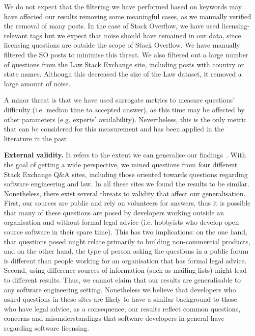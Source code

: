 \documentclass{elsarticle}
\begin{document}
We do not expect that the filtering we have performed based on keywords may have affected our results removing some meaningful cases, as we manually verified the removal of many posts. In the case of Stack Overflow, we have used licensing-relevant tags but we expect that noise should have remained in our data, since licensing questions are outside the scope of Stack Overflow. We have manually filtered the SO posts to minimise this threat. We also filtered out a large number of questions from the Law Stack Exchange site, including posts with country or state names. Although this decreased the size of the Law dataset, it removed a large amount of noise.

A minor threat is that we have used surrogate metrics to measure questions' difficulty (i.e. median time to accepted answer), as this time may be affected by other parameters (e.g. experts' availability). Nevertheless, this is the only metric that can be considered for this measurement and has been applied in the literature in the past~\cite{abdellatif2020challenges}.

\textbf{External validity.} It refers to the extent we can generalise our findings~\cite{yin2013case}. With the goal of getting a wide perspective, we mined questions from four different Stack Exchange Q\&A sites, including those oriented towards questions regarding software engineering and law. In all these sites we found the results to be similar. Nonetheless, there exist several threats to validity that affect our generalisation. First, our sources are public and rely on volunteers for answers, thus it is possible that many of these questions are posed by developers working outside an organisation and without formal legal advice (i.e. hobbyists who develop open source software in their spare time). This has two implications: on the one hand, that questions posed might relate primarily to building non-commercial products, and on the other hand, the type of person asking the questions in a public forum is different than people working for an organisation that has formal legal advice. Second, using difference sources of information (such as mailing lists) might lead to different results. Thus, we cannot claim that our results are generalisable to any software engineering setting. Nonetheless we believe that developers who asked questions in these sites are likely to have a similar background to those who have legal advice, as a consequence, our results reflect common questions, concerns and misunderstandings that software developers in general have regarding software licensing.
\end{document}
